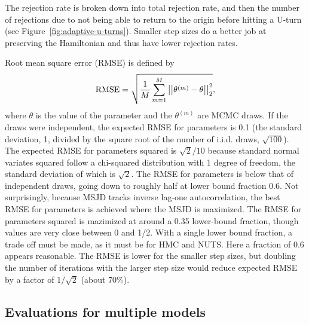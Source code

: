\documentclass[letterpaper,11pt]{article}
\theoremstyle{plain}%
\theoremstyle{remark}
\begin{document}
The rejection rate is broken down into total rejection rate, and then the number of rejections due to not being able to return to the origin before hitting a U-turn (see Figure~\ref{fig:adaptive-u-turns}).  Smaller step sizes do a better job at preserving the Hamiltonian and thus have lower rejection rates.  

Root mean square error (RMSE) is defined by
\begin{equation}
\textrm{RMSE} = \sqrt{\frac{1}{M} \sum_{m=1}^M \left|\left|\theta^{(m)} - \theta\right|\right|_2^2},
\end{equation}
where $\theta$ is the value of the parameter and the $\theta^{(m)}$ are MCMC draws.  If the draws were independent, the expected RMSE for parameters is 0.1 (the standard deviation, 1, divided by the square root of the number of i.i.d. draws, $\sqrt{100}$).  The expected RMSE for parameters squared is $\sqrt{2} / 10$ because standard normal variates squared follow a chi-squared distribution with 1 degree of freedom, the standard deviation of which is $\sqrt{2}$.  The RMSE for parameters is below that of independent draws, going down to roughly half at lower bound fraction 0.6.  Not surprisingly, because MSJD tracks inverse lag-one autocorrelation, the best RMSE for parameters is achieved where the MSJD is maximized.  The RMSE for parameters squared is mazimized at around a 0.35 lower-bound fraction, though values are very close between 0 and 1/2.  With a single lower bound fraction, a trade off must be made, as it must be for HMC and NUTS.  Here a fraction of 0.6 appears reasonable.  The RMSE is lower for the smaller step sizes, but doubling the number of iterations with the larger step size would reduce expected RMSE by a factor of $1 / \sqrt{2}$ (about 70\%).


\subsection{Evaluations for multiple models}
\end{document}
